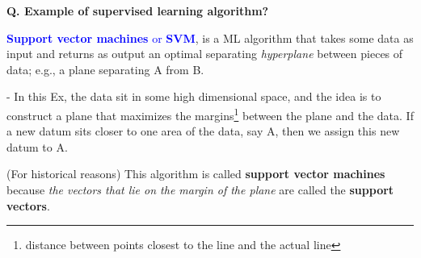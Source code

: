 \begin{frame}[fragile]{\textbf{Q. Example of supervised learning algorithm?}}
  \vspace{.4em}
  \begin{wideitemize}
    \item \textcolor{blue}{\textbf{Support vector machines} or \textbf{SVM}},
    is a ML algorithm that takes some data as input and returns as output
    an optimal separating \textit{hyperplane} between pieces of data; e.g., a
    plane separating A from B.
    \begin{wideitemize}
    \item[-] In this Ex, the data sit in some high dimensional space, and
      the idea is to construct a plane that maximizes the
      margins\footnote{distance between points closest to the line and the
        actual line} between the plane and the data. {\footnotesize If a new
        datum sits closer to one area of the data, say A, then we assign this
        new datum to A.}
    \end{wideitemize}
    \item (For historical reasons) This algorithm is called \textbf{support
    vector machines} because \textit{the vectors that lie on the margin of the plane} are
    called the \textbf{support vectors}.
  \end{wideitemize}


\end{frame}




